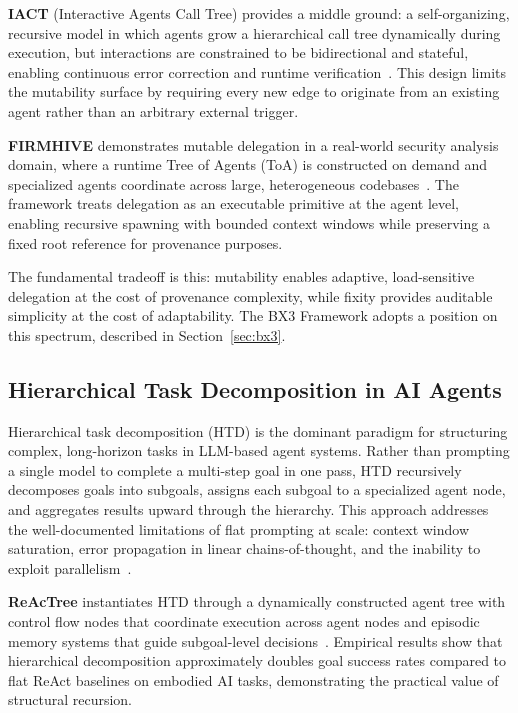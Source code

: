 \textbf{IACT} (Interactive Agents Call Tree) provides a middle ground: a self-organizing, recursive model in which agents grow a hierarchical call tree dynamically during execution, but interactions are constrained to be bidirectional and stateful, enabling continuous error correction and runtime verification~\cite{iact2025}. This design limits the mutability surface by requiring every new edge to originate from an existing agent rather than an arbitrary external trigger.

\textbf{FIRMHIVE} demonstrates mutable delegation in a real-world security analysis domain, where a runtime Tree of Agents (ToA) is constructed on demand and specialized agents coordinate across large, heterogeneous codebases~\cite{firmhive2024}. The framework treats delegation as an executable primitive at the agent level, enabling recursive spawning with bounded context windows while preserving a fixed root reference for provenance purposes.

The fundamental tradeoff is this: mutability enables adaptive, load-sensitive delegation at the cost of provenance complexity, while fixity provides auditable simplicity at the cost of adaptability. The BX3 Framework adopts a position on this spectrum, described in Section~\ref{sec:bx3}.

\subsection{Hierarchical Task Decomposition in AI Agents}
\label{sec:task-decomposition}

Hierarchical task decomposition (HTD) is the dominant paradigm for structuring complex, long-horizon tasks in LLM-based agent systems. Rather than prompting a single model to complete a multi-step goal in one pass, HTD recursively decomposes goals into subgoals, assigns each subgoal to a specialized agent node, and aggregates results upward through the hierarchy. This approach addresses the well-documented limitations of flat prompting at scale: context window saturation, error propagation in linear chains-of-thought, and the inability to exploit parallelism~\cite{structuredtesttime2026}.

\textbf{ReAcTree} instantiates HTD through a dynamically constructed agent tree with control flow nodes that coordinate execution across agent nodes and episodic memory systems that guide subgoal-level decisions~\cite{reactree2025}. Empirical results show that hierarchical decomposition approximately doubles goal success rates compared to flat ReAct baselines on embodied AI tasks, demonstrating the practical value of structural recursion.

